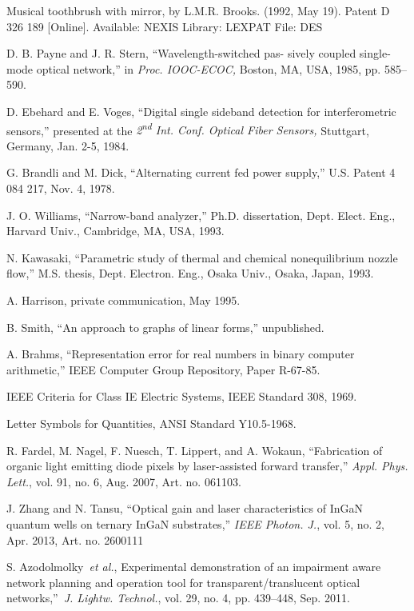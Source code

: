 \documentclass{ieeeaccess}
\begin{document}
\begin{thebibliography}{00}
 Musical toothbrush with mirror, by L.M.R. Brooks. (1992, May 19). Patent D 326 189 [Online]. Available: NEXIS Library: LEXPAT File: DES

 D. B. Payne and J. R. Stern, ``Wavelength-switched pas- sively coupled single-mode optical network,'' in \emph{Proc. IOOC-ECOC,} Boston, MA, USA, 1985, pp. 585--590.

 D. Ebehard and E. Voges, ``Digital single sideband detection for interferometric sensors,'' presented at the \emph{2\textsuperscript{nd} Int. Conf. Optical Fiber Sensors,} Stuttgart, Germany, Jan. 2-5, 1984.

 G. Brandli and M. Dick, ``Alternating current fed power supply,'' U.S. Patent 4 084 217, Nov. 4, 1978.

 J. O. Williams, ``Narrow-band analyzer,'' Ph.D. dissertation, Dept. Elect. Eng., Harvard Univ., Cambridge, MA, USA, 1993.

 N. Kawasaki, ``Parametric study of thermal and chemical nonequilibrium nozzle flow,'' M.S. thesis, Dept. Electron. Eng., Osaka Univ., Osaka, Japan, 1993.

 A. Harrison, private communication, May 1995.

 B. Smith, ``An approach to graphs of linear forms,'' unpublished.

 A. Brahms, ``Representation error for real numbers in binary computer arithmetic,'' IEEE Computer Group Repository, Paper R-67-85.

 IEEE Criteria for Class IE Electric Systems, IEEE Standard 308, 1969.

 Letter Symbols for Quantities, ANSI Standard Y10.5-1968.

 R. Fardel, M. Nagel, F. Nuesch, T. Lippert, and A. Wokaun, ``Fabrication of organic light emitting diode pixels by laser-assisted forward transfer,'' \emph{Appl. Phys. Lett.}, vol. 91, no. 6, Aug. 2007, Art. no. 061103.~

 J. Zhang and N. Tansu, ``Optical gain and laser characteristics of InGaN quantum wells on ternary InGaN substrates,'' \emph{IEEE Photon. J.}, vol. 5, no. 2, Apr. 2013, Art. no. 2600111

 S. Azodolmolky~\emph{et al.}, Experimental demonstration of an impairment aware network planning and operation tool for transparent/translucent optical networks,''~\emph{J. Lightw. Technol.}, vol. 29, no. 4, pp. 439--448, Sep. 2011.

\end{thebibliography}
\end{document}
